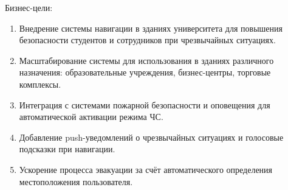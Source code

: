 Бизнес-цели:
\begin{enumerate}
\item Внедрение системы навигации в зданиях университета для повышения безопасности студентов и сотрудников при чрезвычайных ситуациях.

\item Масштабирование системы для использования в зданиях различного назначения: образовательные учреждения, бизнес-центры, торговые комплексы.

\item Интеграция с системами пожарной безопасности и оповещения для автоматической активации режима ЧС.

\item Добавление push-уведомлений о чрезвычайных ситуациях и голосовые подсказки при навигации.

\item Ускорение процесса эвакуации за счёт автоматического определения местоположения пользователя.
\end{enumerate}
